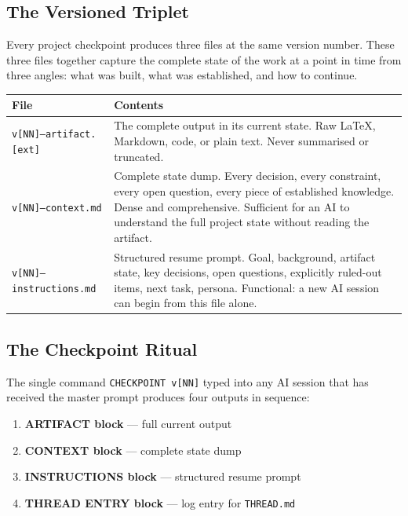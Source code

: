 \documentclass[12pt,letterpaper]{article}
\begin{document}
\subsection{The Versioned Triplet}

Every project checkpoint produces three files at the same version number.
These three files together capture the complete state of the work at a
point in time from three angles: what was built, what was established, and
how to continue.

\begin{center}
\begin{tabular}{@{}lp{10cm}@{}}
\toprule
\textbf{File} & \textbf{Contents} \\
\midrule
\texttt{v[NN]--artifact.[ext]} &
The complete output in its current state. Raw LaTeX, Markdown,
code, or plain text. Never summarised or truncated. \\
\texttt{v[NN]--context.md} &
Complete state dump. Every decision, every constraint, every open
question, every piece of established knowledge. Dense and comprehensive.
Sufficient for an AI to understand the full project state without
reading the artifact. \\
\texttt{v[NN]--instructions.md} &
Structured resume prompt. Goal, background, artifact state, key decisions,
open questions, explicitly ruled-out items, next task, persona.
Functional: a new AI session can begin from this file alone. \\
\bottomrule
\end{tabular}
\end{center}

\subsection{The Checkpoint Ritual}

The single command \texttt{CHECKPOINT v[NN]} typed into any AI session that
has received the master prompt produces four outputs in sequence:

\begin{enumerate}
  \item \textbf{ARTIFACT block} --- full current output
  \item \textbf{CONTEXT block} --- complete state dump
  \item \textbf{INSTRUCTIONS block} --- structured resume prompt
  \item \textbf{THREAD ENTRY block} --- log entry for \texttt{THREAD.md}
\end{enumerate}
\end{document}
